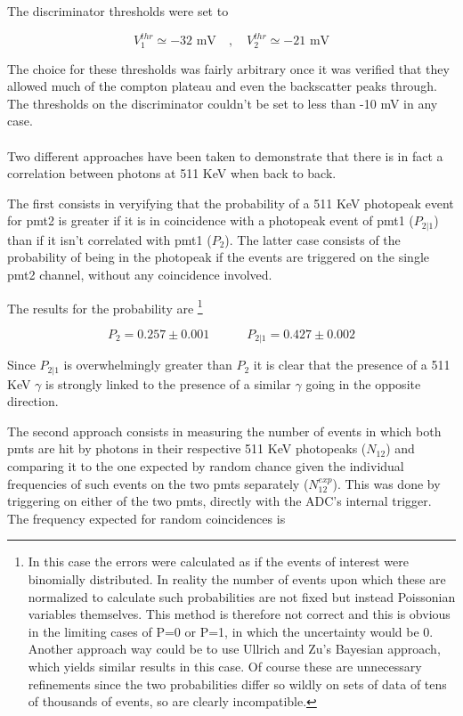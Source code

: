 \documentclass[10pt,a4paper,twocolumn]{article}
\begin{document}
\noindent The discriminator thresholds were set to 

$$V^{thr}_{1}\simeq -32 \text{ mV}\quad , \quad V^{thr}_{2} \simeq -21 \text{ mV} $$
 
\noindent The choice for these thresholds was fairly arbitrary once it was verified that they allowed much of the compton plateau and even the backscatter peaks through. The thresholds on the discriminator couldn't be set to less than -10 mV in any case.
\\
\\
Two different approaches have been taken to demonstrate that there is in fact a correlation between photons at 511 KeV when back to back.

The first consists in veryifying that the probability of a 511 KeV photopeak event for pmt2 is greater if it is in coincidence with a photopeak event of pmt1 ($P_{2|1}$) than if it isn't correlated with pmt1 ($P_2$). The latter case consists of the probability of being in the photopeak if the events are triggered on the single pmt2 channel, without any coincidence involved. 

The results for the probability are \footnote{In this case the errors were calculated as if the events of interest were binomially distributed. In reality the number of events upon which these are normalized to calculate such probabilities are not fixed but instead Poissonian variables themselves. This method is therefore not correct and this is obvious in the limiting cases of P=0 or P=1, in which the uncertainty would be 0. Another approach way could be to use Ullrich and Zu's Bayesian approach, which yields similar results in this case. Of course these are unnecessary refinements since the two probabilities differ so wildly on sets of data of tens of thousands of events, so are clearly incompatible.}

$$ P_2= 0.257 \pm 0.001  \quad \quad \quad  P_{2|1}= 0.427 \pm 0.002$$

\noindent Since $ P_{2|1}$ is overwhelmingly greater than $P_2$ it is clear that the presence of a 511 KeV $\gamma$ is strongly linked to the presence of a similar $\gamma$ going in the opposite direction.

The second approach consists in measuring the number of events in which both pmts are hit by photons in their respective 511 KeV photopeaks ($N_{12}$) and comparing it to the one expected by random chance given the individual frequencies of such events on the two pmts separately ($N_{12}^{exp}$). This was done by triggering on either of the two pmts, directly with the ADC's internal trigger. The frequency expected for random coincidences is 
\end{document}
